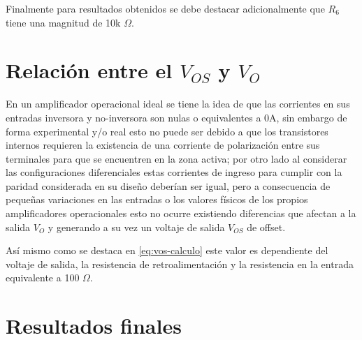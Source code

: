 Finalmente para resultados obtenidos se debe destacar adicionalmente que $R_6$ tiene una magnitud de 10k $\Omega$.

\section{ Relación entre el $V_{OS}$ y $V_O$}

En un amplificador operacional ideal se tiene la idea de que las corrientes en sus entradas inversora y no-inversora son nulas o equivalentes a 0A, sin embargo de forma experimental y/o real esto no puede ser debido a que los transistores internos requieren la existencia de una corriente de polarización entre sus terminales para que se encuentren en la zona activa; por otro lado al considerar las configuraciones diferenciales estas corrientes de ingreso para cumplir con la paridad considerada en su diseño deberían ser igual, pero a consecuencia de pequeñas variaciones en las entradas o los valores físicos de los propios amplificadores operacionales esto no ocurre existiendo diferencias que afectan a la salida $V_O$ y generando a su vez un voltaje de salida $V_{OS}$ de offset.

Así mismo como se destaca en \ref{eq:vos-calculo} este valor es dependiente del voltaje de salida, la resistencia de retroalimentación y la resistencia en la entrada equivalente a 100 $\Omega$.

\section{Resultados finales}


























